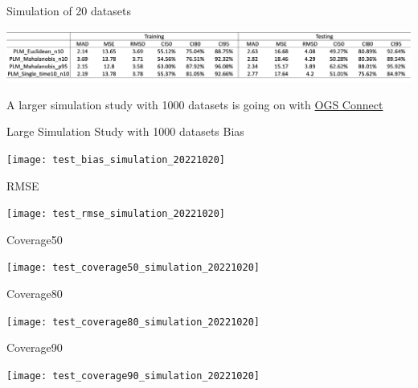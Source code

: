 \documentclass[
  8pt,
  ignorenonframetext,
]{beamer}
\begin{document}
\begin{frame}{Simulation of 20 datasets}
\protect\hypertarget{simulation-of-20-datasets}{}
\begin{center}\includegraphics[width=1.2\linewidth]{figure/fig3} \end{center}

A larger simulation study with 1000 datasets is going on with
\href{https://www.osgconnect.net/}{OGS Connect}
\end{frame}

\begin{frame}{Large Simulation Study with 1000 datasets}
\protect\hypertarget{large-simulation-study-with-1000-datasets}{}
Bias

\begin{center}\texttt{[image: test\_bias\_simulation\_20221020]} \end{center}
\end{frame}

\begin{frame}{}
\protect\hypertarget{section}{}
RMSE

\begin{center}\texttt{[image: test\_rmse\_simulation\_20221020]} \end{center}
\end{frame}

\begin{frame}{}
\protect\hypertarget{section-1}{}
Coverage50

\begin{center}\texttt{[image: test\_coverage50\_simulation\_20221020]} \end{center}
\end{frame}

\begin{frame}{Coverage80}
\protect\hypertarget{coverage80}{}
\begin{center}\texttt{[image: test\_coverage80\_simulation\_20221020]} \end{center}
\end{frame}

\begin{frame}{Coverage90}
\protect\hypertarget{coverage90}{}
\begin{center}\texttt{[image: test\_coverage90\_simulation\_20221020]} \end{center}
\end{frame}
\end{document}
